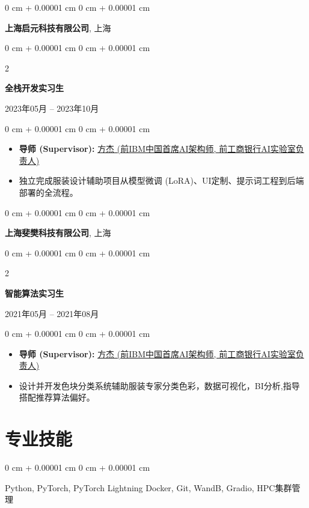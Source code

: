 \documentclass[10pt, letterpaper]{article}
\newenvironment{highlights}{
    \begin{itemize}[
        topsep=0.10 cm,
        parsep=0.10 cm,
        partopsep=0pt,
        itemsep=0pt,
        leftmargin=0 cm + 10pt
    ]
}{
    \end{itemize}
} %
\newenvironment{highlightsforbulletentries}{
    \begin{itemize}[
        topsep=0.10 cm,
        parsep=0.10 cm,
        partopsep=0pt,
        itemsep=0pt,
        leftmargin=10pt
    ]
}{
    \end{itemize}
} %
\newenvironment{onecolentry}{
    \begin{adjustwidth}{
        0 cm + 0.00001 cm
    }{
        0 cm + 0.00001 cm
    }
}{
    \end{adjustwidth}
} %
\newenvironment{twocolentry}[2][]{
    \onecolentry
    \def\secondColumn{#2}
    \setcolumnwidth{\fill, 4.5 cm}
    \begin{paracol}{2}
}{
    \switchcolumn \raggedleft \secondColumn
    \end{paracol}
    \endonecolentry
} %
\begin{document}
    \vspace{0.2 cm}

    \begin{onecolentry}
         \large\textbf{上海启元科技有限公司}, 上海
    \end{onecolentry}
    \begin{twocolentry}{
        2023年05月 – 2023年10月
    }
       \textbf{全栈开发实习生}
    \end{twocolentry}
    \begin{onecolentry}
        \begin{highlights}
            \item \textbf{导师 (Supervisor):} \href{https://www.linkedin.com/in/jie-fang-28293740}{方杰 (前IBM中国首席AI架构师, 前工商银行AI实验室负责人)}
            \item 独立完成服装设计辅助项目从模型微调 (LoRA)、UI定制、提示词工程到后端部署的全流程。
        \end{highlights}
    \end{onecolentry}

    \vspace{0.2 cm}
    
    \begin{onecolentry}
        \large\textbf{上海斐樊科技有限公司}, 上海
    \end{onecolentry}
    \begin{twocolentry}{
        2021年05月 – 2021年08月
    }
        \textbf{智能算法实习生}
    \end{twocolentry}
    \begin{onecolentry}
        \begin{highlights}
            \item \textbf{导师 (Supervisor):} \href{https://www.linkedin.com/in/jie-fang-28293740}{方杰 (前IBM中国首席AI架构师, 前工商银行AI实验室负责人)}
            \item 设计并开发色块分类系统辅助服装专家分类色彩，数据可视化，BI分析,指导搭配推荐算法偏好。
        \end{highlights}
    \end{onecolentry}

    \section{专业技能}
        
        \begin{onecolentry}
            \begin{highlightsforbulletentries}
                Python, PyTorch, PyTorch Lightning Docker, Git, WandB, Gradio, HPC集群管理
            \end{highlightsforbulletentries}
        \end{onecolentry}
\end{document}
